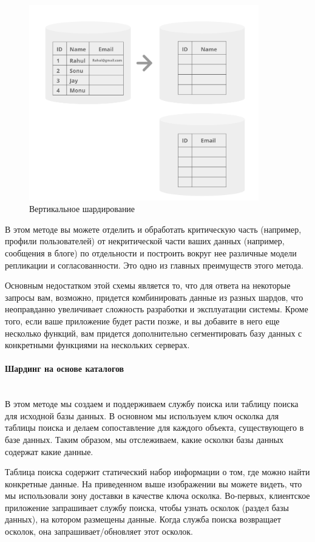 \begin{figure}[H]
    \centering
    \includegraphics[width=100mm]{assets/distributed/Vertical-Sharding}
    \caption{Вертикальное шардирование}
    \label{fig:Vertical-Sharding}
\end{figure}

В этом методе вы можете отделить и обработать критическую часть (например, профили пользователей) от некритической части
ваших данных (например, сообщения в блоге) по отдельности и построить вокруг нее различные модели репликации и
согласованности. Это одно из главных преимуществ этого метода.

Основным недостатком этой схемы является то, что для ответа на некоторые запросы вам, возможно, придется комбинировать
данные из разных шардов, что неоправданно увеличивает сложность разработки и эксплуатации системы. Кроме того, если
ваше приложение будет расти позже, и вы добавите в него еще несколько функций, вам придется дополнительно сегментировать
базу данных с конкретными функциями на нескольких серверах. \autocite{DatabaseSharding}

\paragraph{Шардинг на основе каталогов} ~\\
В этом методе мы создаем и поддерживаем службу поиска или таблицу поиска для исходной базы данных. В основном мы
используем ключ осколка для таблицы поиска и делаем сопоставление для каждого объекта, существующего в базе данных.
Таким образом, мы отслеживаем, какие осколки базы данных содержат какие данные.

Таблица поиска содержит статический набор информации о том, где можно найти конкретные данные. На приведенном выше
изображении вы можете видеть, что мы использовали зону доставки в качестве ключа осколка. Во-первых, клиентское
приложение запрашивает службу поиска, чтобы узнать осколок (раздел базы данных), на котором размещены данные. Когда
служба поиска возвращает осколок, она запрашивает/обновляет этот осколок.

